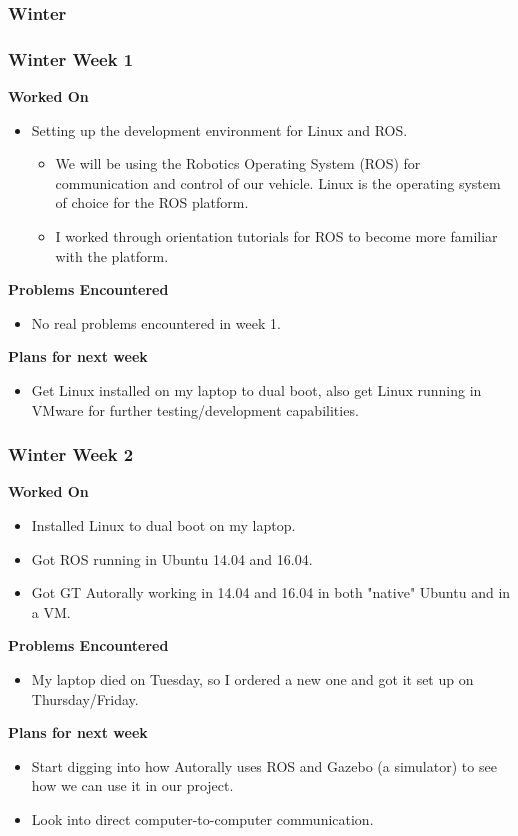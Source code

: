 \documentclass[compsoc,draftclsnofoot,onecolumn,10pt]{IEEEtran}
\begin{document}
\subsubsection{Winter}
\subsubsection*{Winter Week 1}
\textbf{Worked On}
\begin{itemize}
    \item Setting up the development environment for Linux and ROS.
    \begin{itemize}
        \item We will be using the Robotics Operating System (ROS) for communication and control of our vehicle. Linux is the operating system of choice for the ROS platform.
        \item I worked through orientation tutorials for ROS to become more familiar with the platform.
    \end{itemize}
\end{itemize}
\textbf{Problems Encountered}
\begin{itemize}
    \item No real problems encountered in week 1.
\end{itemize}
\textbf{Plans for next week}
\begin{itemize}
    \item Get Linux installed on my laptop to dual boot, also get Linux running in VMware for further testing/development capabilities.
\end{itemize}


\subsubsection*{Winter Week 2}
\textbf{Worked On}
\begin{itemize}
    \item Installed Linux to dual boot on my laptop.
    \item Got ROS running in Ubuntu 14.04 and 16.04.
    \item Got GT Autorally working in 14.04 and 16.04 in both "native" Ubuntu and in a VM.
\end{itemize}
\textbf{Problems Encountered}
\begin{itemize}
    \item My laptop died on Tuesday, so I ordered a new one and got it set up on Thursday/Friday.
\end{itemize}
\textbf{Plans for next week}
\begin{itemize}
    \item Start digging into how Autorally uses ROS and Gazebo (a simulator) to see how we can use it in our project.
    \item Look into direct computer-to-computer communication.
\end{itemize}
\end{document}
